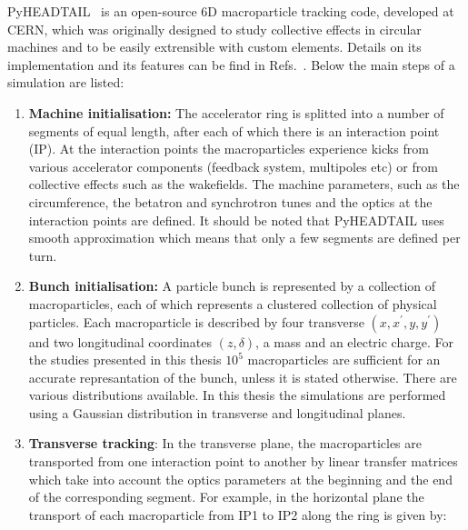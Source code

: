 {{PyHEADTAIL~\cite{pyheadtail_repository} is an open-source 6D macroparticle tracking code, developed at CERN, which was originally designed to study collective effects in circular machines and to be easily extrensible with custom elements. 
Details on its implementation and its features can be find in Refs.~\cite{pyheadtail_manual_adrian, pyheadtail_schenk}. Below the main steps of a simulation are listed: %


\begin{enumerate}
    \item \textbf{Machine initialisation:} The accelerator ring is splitted into a number of segments of equal length, after each of which there is an interaction point (IP). At the interaction points the macroparticles experience kicks from various accelerator components (feedback system, multipoles etc) or from collective effects such as the wakefields. The machine parameters, such as the circumference, the betatron and synchrotron tunes and the optics at the interaction points are defined. It should be noted that PyHEADTAIL uses smooth approximation which means that only a few segments are defined per turn. %
    \item \textbf{Bunch initialisation:}  A particle bunch is represented by a collection of macroparticles, each of which represents a clustered collection of physical particles. Each macroparticle is described by four transverse $(x, x^\prime, y, y^\prime)$ and two longitudinal coordinates $(z, \delta)$, a mass and an electric charge. For the studies presented in this thesis $10^{5}$ macroparticles are sufficient for an accurate represantation of the bunch, unless it is stated otherwise. There are various distributions available. In this thesis the simulations are performed using a Gaussian distribution in transverse and longitudinal planes.
    \item \textbf{Transverse tracking}: In the transverse plane, the macroparticles are transported from one interaction point to another by linear transfer matrices which take into account the optics parameters at the beginning and the end of the corresponding segment. For example, in the horizontal plane the transport of each macroparticle from IP1 to IP2 along the ring is given by:

\end{enumerate}}}
